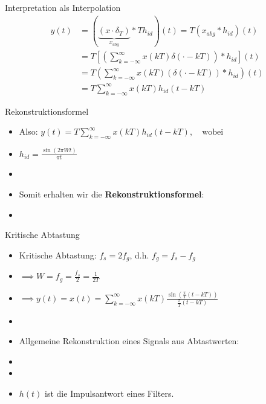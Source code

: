 \documentclass[14pt, aspectratio=169, handout]{beamer}
\begin{document}
\begin{frame}{Interpretation als Interpolation}
    \vspace*{-0.5cm}
    \begin{align*}
        y(t) &= \left(\underbrace{(x \cdot \delta_T)}_{x_{abg}} \ast T h_{id}\right)(t) = T (x_{abg} \ast h_{id})(t) \\
        &= T \left[ \left( \sum_{k = -\infty}^{\infty} x(kT) \delta(\cdot -kT) \right)  \ast h_{id} \right](t) \\
        &= T \left( \sum_{k = -\infty}^{\infty} x(kT) \left(\delta(\cdot -kT) \right)  \ast h_{id}\right) (t) \\
        &= T \sum_{k = -\infty}^{\infty} x(kT) h_{id}(t-kT)
    \end{align*}
\end{frame}

\begin{frame}{Rekonstruktionsformel}
    \begin{itemize}
        \item[] Also: $y(t) = T \displaystyle\sum_{k = -\infty}^{\infty} x(kT) h_{id}(t-kT), \hspace{12pt} \text{wobei}$
        \item[] $h_{id} = \displaystyle\frac{\sin(2 \pi W t)}{\pi t}$
        \item[] 
        \item[]  Somit erhalten wir die \textbf{Rekonstruktionsformel}:
        \item[] 
    \end{itemize}
\end{frame}

\begin{frame}{Kritische Abtastung}
    \begin{itemize}
    \item Kritische Abtastung: $f_s = 2 f_g$, d.h. $f_g = f_s - f_g$
    \item[] $\implies W = f_g = \frac{f_s}{2} = \frac{1}{2T}$
    \item[] $\implies y(t) = x(t) = \displaystyle\sum_{k=-\infty}^\infty x(kT)\displaystyle\frac{\sin\left(\frac{\pi}{T}(t-kT)\right)}{\frac{\pi}{T}(t-kT)}$
    \item[] 
    \item Allgemeine Rekonstruktion eines Signals aus Abtastwerten:
    \item[] 
    \item[] 
    \item $h(t)$ ist die Impulsantwort eines Filters.
\end{itemize}
\end{frame}
\end{document}
